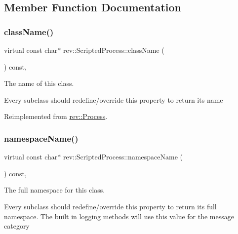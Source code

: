\subsection{Member Function Documentation}
\mbox{\label{classrev_1_1_scripted_process_acf76a8590e80b9cf16c155639d721065}} 
\subsubsection{\texorpdfstring{className()}{className()}}
{\footnotesize\ttfamily virtual const char$\ast$ rev\+::\+Scripted\+Process\+::class\+Name (\begin{DoxyParamCaption}{ }\end{DoxyParamCaption}) const\hspace{0.3cm}{\ttfamily [inline]}, {\ttfamily [virtual]}}



The name of this class. 

Every subclass should redefine/override this property to return its name 

Reimplemented from \mbox{\hyperlink{classrev_1_1_process_adc27ddf4c0f44dab54a5f797c7135c44}{rev\+::\+Process}}.

\mbox{\label{classrev_1_1_scripted_process_a160dbc327ce205f9999d8c5c276559a9}} 
\subsubsection{\texorpdfstring{namespaceName()}{namespaceName()}}
{\footnotesize\ttfamily virtual const char$\ast$ rev\+::\+Scripted\+Process\+::namespace\+Name (\begin{DoxyParamCaption}{ }\end{DoxyParamCaption}) const\hspace{0.3cm}{\ttfamily [inline]}, {\ttfamily [virtual]}}



The full namespace for this class. 

Every subclass should redefine/override this property to return its full namespace. The built in logging methods will use this value for the message category 

